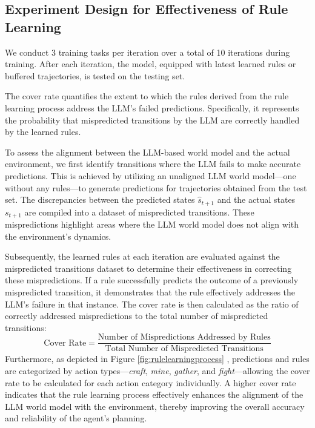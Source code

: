 \documentclass{article} %
\begin{document}
\subsection{Experiment Design for Effectiveness of Rule Learning}
\label{sec:Experiment Design for Effectiveness of Rule Learning}

We conduct 3 training tasks per iteration over a total of 10 iterations during training. After each iteration, the model, equipped with latest learned rules or buffered trajectories, is tested on the testing set.

The cover rate quantifies the extent to which the rules derived from the rule learning process address the LLM's failed predictions. 
Specifically, it represents the probability that mispredicted transitions by the LLM are correctly handled by the learned rules.

To assess the alignment between the LLM-based world model and the actual environment, 
we first identify transitions where the LLM fails to make accurate predictions. This is achieved by utilizing an unaligned LLM world model—one without any rules—to generate predictions for trajectories obtained from the test set. The discrepancies between the predicted states \( \hat{s}_{t+1} \) and the actual states \( s_{t+1} \) are compiled into a dataset of mispredicted transitions.
These mispredictions highlight areas where the LLM world model does not align with the environment's dynamics.

Subsequently, the learned rules at each iteration are evaluated against the mispredicted transitions dataset to determine their effectiveness in correcting these mispredictions.
If a rule successfully predicts the outcome of a previously mispredicted transition, it demonstrates that the rule effectively addresses the LLM's failure in that instance. The cover rate is then calculated as the ratio of correctly addressed mispredictions to the total number of mispredicted transitions:
\begin{equation}
    \text{Cover Rate} = \frac{\text{Number of Mispredictions Addressed by Rules}}{\text{Total Number of Mispredicted Transitions}}
\end{equation}
Furthermore, as depicted in Figure \ref{fig:rulelearningprocess} , predictions and rules are categorized by action types—\textit{craft}, \textit{mine}, \textit{gather}, and \textit{fight}—allowing the cover rate to be calculated for each action category individually.
A higher cover rate indicates that the rule learning process effectively enhances the alignment of the LLM world model with the environment, thereby improving the overall accuracy and reliability of the agent's planning.
\end{document}
